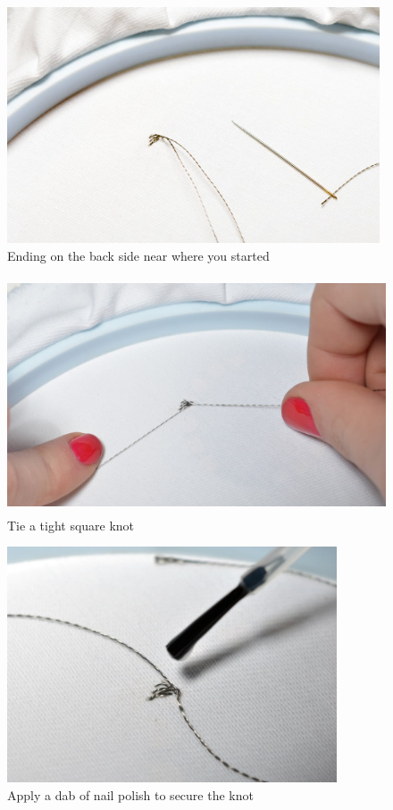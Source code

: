 \documentclass[letterpaper,twoside,12pt]{article}
\begin{document}
\begin{figure}[hbpt]\begin{centering}%
\includegraphics[height=2.75in]{flora_DSC_0106.jpg}
\caption{Ending on the back side near where you started}
\label{fig:flora_DSC_0106}
\end{centering}\end{figure}
\begin{figure}[hbpt]\begin{centering}%
\includegraphics[height=2.75in]{flora_DSC_0107.jpg}
\caption{Tie a tight square knot}
\label{fig:flora_DSC_0107}
\end{centering}\end{figure}
\begin{figure}[hbpt]\begin{centering}%
\includegraphics[height=2.75in]{flora_DSC_0109.jpg}
\caption{Apply a dab of nail polish to secure the knot}
\label{fig:flora_DSC_0109}
\end{centering}\end{figure}
\end{document}

